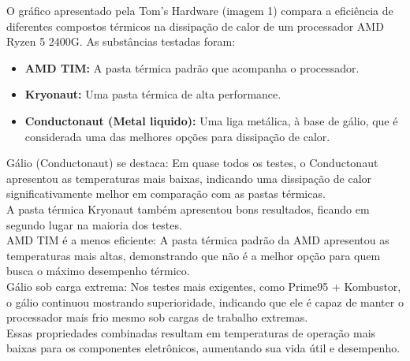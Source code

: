 \documentclass[12pt]{article}
\begin{document}
O gráfico apresentado pela Tom's Hardware (imagem 1) compara a eficiência de diferentes compostos térmicos na dissipação de calor de um processador AMD Ryzen 5 2400G. 
As substâncias testadas foram:
\\
\begin{itemize}
    \item \textbf{AMD TIM:} A pasta térmica padrão que acompanha o processador.
    \item \textbf{Kryonaut:} Uma pasta térmica de alta performance.
    \item \textbf{Conductonaut (Metal liquido):} Uma liga metálica, à base de gálio, que é considerada uma das melhores opções para dissipação de calor.
\end{itemize}

Gálio (Conductonaut) se destaca: Em quase todos os testes, o Conductonaut apresentou as temperaturas mais baixas, indicando uma dissipação de calor significativamente melhor em comparação com as pastas térmicas.\\
A pasta térmica Kryonaut também apresentou bons resultados, ficando em segundo lugar na maioria dos testes.\\

AMD TIM é a menos eficiente: A pasta térmica padrão da AMD apresentou as temperaturas mais altas, demonstrando que não é a melhor opção para quem busca o máximo desempenho térmico.\\
Gálio sob carga extrema: Nos testes mais exigentes, como Prime95 + Kombustor, o gálio continuou mostrando superioridade, indicando que ele é capaz de manter o processador mais frio mesmo sob cargas de trabalho extremas.\\
Essas propriedades combinadas resultam em temperaturas de operação mais baixas para os componentes eletrônicos, aumentando sua vida útil e desempenho.\\
\end{document}
